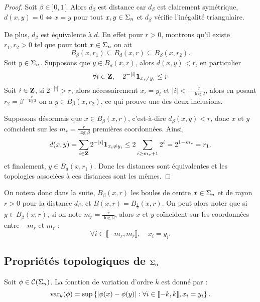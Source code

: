   \begin{proof}
    Soit $\beta \in ]0, 1[$. Alors $d_{\beta}$ est distance car $d_{\beta}$ est clairement symétrique, $d(x, y) = 0 \iff x = y$ pour tout $x,y\in\Sigma_n$
    et $d_{\beta}$ vérifie l'inégalité triangulaire.

    De plus, $d_{\beta}$ est équivalente à $d$. En effet pour $r > 0$, montrons qu'il existe $r_1, r_2 > 0$ tel que pour tout $x \in \Sigma_n$ on ait
    $$B_{\beta}(x, r_1) \subseteq  B_d(x, r) \subseteq B_{\beta}(x, r_2).$$
    Soit $y \in \Sigma_n$. Supposons que $y \in B_d(x, r)$, alors $d(x, y) < r$, en particulier
    $$\forall i \in \mathbf Z, \hspace{1em}2^{-|i|}\mathbf{1}_{x_i \not= y_i} \leq r$$
    Soit $i \in \mathbf Z$, si $2^{-|i|} > r$, alors nécessairement $x_i = y_i$ et $|i| < -\frac{r}{\log{2}}$,
    alors en posant $r_2 = \beta^{-\frac{r}{\log{2}}}$ on a $y \in B_{\beta}(x, r_2)$, ce qui prouve une des deux inclusions.

    Supposons désormais que $x \in B_{\beta}(x, r)$, c'est-à-dire $d_{\beta}(x, y) < r$,
    donc $x$ et $y$ coïncident sur les $m_r = \frac{r}{\log{\beta}}$ premières coordonnées.
    Ainsi,
    $$d(x, y) = \sum_{i\in\mathbf Z}{2^{-|i|}\mathbf{1}_{x_i \not= y_i}} \leq 2\sum_{i \geq m_r + 1}{2^i} = 2^{1 - m_r} = r_1.$$
    et finalement, $y \in B_d(x, r_1)$. Donc les distances sont équivalentes et les topologies associées à ces distances sont les mêmes.
  \end{proof}

  On notera donc dans la suite, $B_{\beta}(x, r)$ les boules de centre $x \in \Sigma_n$ et de rayon $r > 0$ pour la distance $d_{\beta}$,
  et $B(x, r) = B_{\frac 1 2}(x, r)$.
  On peut alors noter que si $y \in B_{\beta}(x, r)$, si on note $m_r = \frac{r}{\log{\beta}}$, alors $x$ et $y$ coïncident sur les coordonnées entre
  $-m_r$ et $m_r$ :
  $$\forall i \in \llbracket -m_r, m_r \rrbracket, \hspace{1em} x_i = y_i.$$

  \subsection{Propriétés topologiques de $\Sigma_n$}

  \begin{definition}
    \label{def:var_potentiel}
    Soit $\phi \in \mathcal{C} (\Sigma_{n})$. La fonction de variation d'ordre $k$ est donné par :
    $$\operatorname{var}_k(\phi) = \sup\left\{|\phi(x) - \phi(y)| : \forall i \in [\![ -k, k]\!], x_i = y_i \right\}.$$
  \end{definition}

